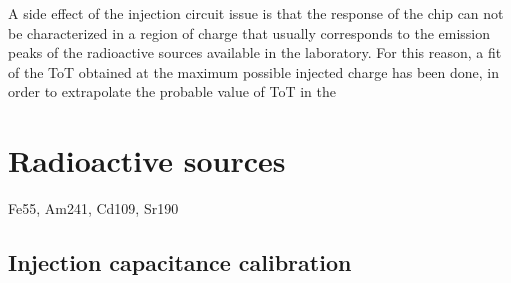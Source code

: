 A side effect of the injection circuit issue is that the response of the chip can not be characterized in a region of charge that usually corresponds to the emission peaks of the radioactive sources available in the laboratory. 
For this reason, a fit of the ToT obtained at the maximum possible injected charge has been done, in order to extrapolate the probable value of ToT in the

\section{Radioactive sources}

Fe55, Am241, Cd109, Sr190

\subsection{Injection capacitance calibration}





\begin{comment}
In the prototype under test (the chip W14R12), some problems had come up right from the beginning, for both the analog and digital part of the pixel readout.
Despite its predecessor Tj-Monopix 1, Tj-Monopix 2 is equipped with a circuit which allows the \textit{threshold tuning}. In other words it can adjust every pixel threshold, even if only by few DAC, in order to have a global threshold on the matrix as uniform as possible, or in any case a dispersion as small as possible.
\end{comment}





